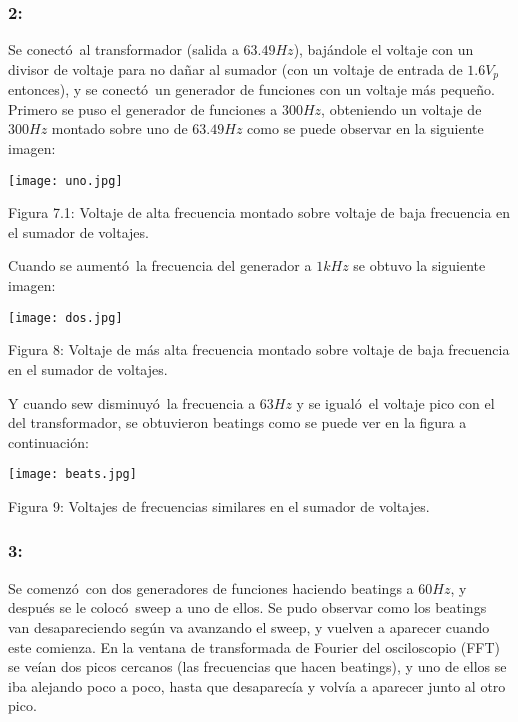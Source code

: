 \documentclass{article}
\begin{document}
\subsubsection*{2:}
Se conect\'o\ al transformador (salida a $63.49Hz$), baj\'andole el voltaje con un divisor de voltaje para no da\~nar al sumador (con un voltaje de entrada de $1.6V_p$ entonces), y se conect\'o\ un generador de funciones con un voltaje m\'as peque\~no. Primero se puso el generador de funciones a $300Hz$, obteniendo un voltaje de $300Hz$ montado sobre uno de $63.49Hz$ como se puede observar en la siguiente imagen:
\begin{center}
\texttt{[image: uno.jpg]}
\end{center}
\begin{center}
Figura 7.1: Voltaje de alta frecuencia montado sobre voltaje de baja frecuencia en el sumador de voltajes.
\end{center}
Cuando se aument\'o\ la frecuencia del generador a $1kHz$ se obtuvo la siguiente imagen:
\begin{center}
\texttt{[image: dos.jpg]}
\end{center}
\begin{center}
Figura 8: Voltaje de m\'as alta frecuencia montado sobre voltaje de baja frecuencia en el sumador de voltajes.
\end{center}
Y cuando sew disminuy\'o\ la frecuencia a $63Hz$ y se igual\'o\ el voltaje pico con el del transformador, se obtuvieron beatings como se puede ver en la figura a continuaci\'on:
\begin{center}
\texttt{[image: beats.jpg]}
\end{center}
\begin{center}
Figura 9: Voltajes de frecuencias similares en el sumador de voltajes.
\end{center}

\subsubsection*{3:}
Se comenz\'o\ con dos generadores de funciones haciendo beatings a $60Hz$, y despu\'es se le coloc\'o\ sweep a uno de ellos. Se pudo observar como los beatings van desapareciendo seg\'un va avanzando el sweep, y vuelven a aparecer cuando este comienza. En la ventana de transformada de Fourier del osciloscopio (FFT) se ve\'ian dos picos cercanos (las frecuencias que hacen beatings), y uno de ellos se iba alejando poco a poco, hasta que desaparec\'ia y volv\'ia a aparecer junto al otro pico.
\end{document}
